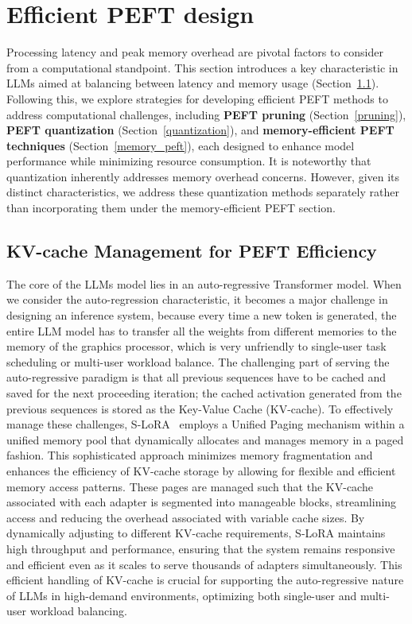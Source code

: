 \section{Efficient PEFT design}
\label{sec:efficiency}
Processing latency and peak memory overhead are pivotal factors to consider from a computational standpoint. 
This section introduces a key characteristic in LLMs aimed at balancing between latency and memory usage (Section~\ref{sec:kv-cache}). Following this, we explore strategies for developing efficient PEFT methods to address computational challenges, including \textbf{PEFT pruning} (Section~\ref{pruning}), \textbf{PEFT quantization} (Section~\ref{quantization}), and \textbf{memory-efficient PEFT techniques} (Section~\ref{memory_peft}), each designed to enhance model performance while minimizing resource consumption.
It is noteworthy that quantization inherently addresses memory overhead concerns. However, given its distinct characteristics, we address these quantization methods separately rather than incorporating them under the memory-efficient PEFT section.


\subsection{KV-cache Management for PEFT Efficiency}
\label{sec:kv-cache}
The core of the LLMs model lies in an auto-regressive Transformer model. When we consider the auto-regression characteristic, it becomes a major challenge in designing an inference system, because every time a new token is generated, the entire LLM model has to transfer all the weights from different memories to the memory of the graphics processor, which is very unfriendly to single-user task scheduling or multi-user workload balance. The challenging part of serving the auto-regressive paradigm is that all previous sequences have to be cached and saved for the next proceeding iteration; the cached activation generated from the previous sequences is stored as the Key-Value Cache (KV-cache). To effectively manage these challenges, S-LoRA~\cite{s-lora} employs a Unified Paging mechanism within a unified memory pool that dynamically allocates and manages memory in a paged fashion. This sophisticated approach minimizes memory fragmentation and enhances the efficiency of KV-cache storage by allowing for flexible and efficient memory access patterns. These pages are managed such that the KV-cache associated with each adapter is segmented into manageable blocks, streamlining access and reducing the overhead associated with variable cache sizes. By dynamically adjusting to different KV-cache requirements, S-LoRA maintains high throughput and performance, ensuring that the system remains responsive and efficient even as it scales to serve thousands of adapters simultaneously. This efficient handling of KV-cache is crucial for supporting the auto-regressive nature of LLMs in high-demand environments, optimizing both single-user and multi-user workload balancing.



